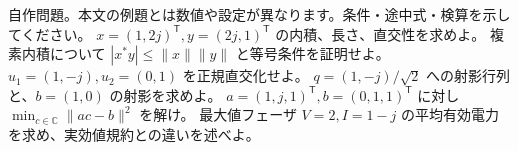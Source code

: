 \documentclass[11pt]{article}
\begin{document}
自作問題。本文の例題とは数値や設定が異なります。条件・途中式・検算を示してください。
\problem[共役内積]
$x=(1,2j)^{\mathsf T},y=(2j,1)^{\mathsf T}$ の内積、長さ、直交性を求めよ。
\workspace{45mm}
複素内積について $|x^*y|\le\|x\|\|y\|$ と等号条件を証明せよ。
\workspace{45mm}
\newpage
{}
$u_1=(1,-j),u_2=(0,1)$ を正規直交化せよ。
\workspace{45mm}
\problem[射影行列]
$q=(1,-j)/\sqrt2$ への射影行列と、$b=(1,0)$ の射影を求めよ。
\workspace{45mm}
\newpage
\problem[複素最小二乗]
$a=(1,j,1)^{\mathsf T},b=(0,1,1)^{\mathsf T}$ に対し $\min_{c\in\mathbb C}\|ac-b\|^2$ を解け。
\workspace{45mm}
\problem[最大値フェーザの電力]
最大値フェーザ $V=2,I=1-j$ の平均有効電力を求め、実効値規約との違いを述べよ。
\workspace{45mm}
\end{document}
